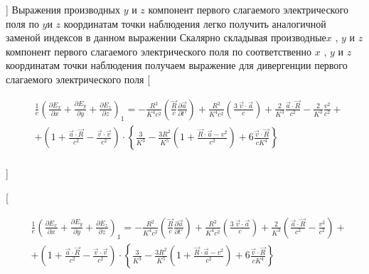 \documentclass[11pt]{article}
\begin{document}
{]} Выражения производных \(y\) и \(z\) компонент первого слагаемого
электрического поля по \(y\)и \(z\) координатам точки наблюдения легко
получить аналогичной заменой индексов в данном выражении Скалярно
складывая производные\(x\) , \(y\) и \(z\)компонент первого слагаемого
электрического поля по соответственно \(x\) , \(y\) и \(z\)координатам
точки наблюдения получаем выражение для дивергенции первого слагаемого
электрического поля {[}

\begin{align}
  & \frac{1}{e}{{\left( \frac{\partial {{E}_{x}}}{\partial x}+\frac{\partial {{E}_{y}}}{\partial y}+\frac{\partial {{E}_{z}}}{\partial z} \right)}_{1}}=-\frac{{{R}^{2}}}{{{K}^{4}}{{c}^{2}}}\left( \frac{\overrightarrow{R}}{c}\frac{\partial \overrightarrow{a}}{\partial t'} \right)+\frac{{{R}^{2}}}{{{K}^{4}}{{c}^{2}}}\left( \frac{3\ \overrightarrow{v}\cdot \overrightarrow{a}}{c} \right)+\frac{2}{{{K}^{3}}}\frac{\overrightarrow{a}\cdot \overrightarrow{R}}{{{c}^{2}}}-\frac{2}{{{K}^{3}}}\frac{{{v}^{2}}}{{{c}^{2}}}+ \\ 
 & +\left( 1+\frac{\overrightarrow{a}\cdot \overrightarrow{R}}{{{c}^{2}}}-\frac{\overrightarrow{v}\cdot \overrightarrow{v}}{{{c}^{2}}} \right)\cdot \left\{ \frac{3}{{{K}^{3}}}-\frac{3{{R}^{2}}}{{{K}^{5}}}\left( 1+\frac{\overrightarrow{R}\cdot \overrightarrow{a}-{{v}^{2}}}{{{c}^{2}}} \right)+6\frac{\overrightarrow{v}\cdot \overrightarrow{R}}{c{{K}^{4}}} \right\} \\ 
\end{align}

{]}

{[}

\begin{align}
  & \frac{1}{e}{{\left( \frac{\partial {{E}_{x}}}{\partial x}+\frac{\partial {{E}_{y}}}{\partial y}+\frac{\partial {{E}_{z}}}{\partial z} \right)}_{1}}=-\frac{{{R}^{2}}}{{{K}^{4}}{{c}^{2}}}\left( \frac{\overrightarrow{R}}{c}\frac{\partial \overrightarrow{a}}{\partial t'} \right)+\frac{{{R}^{2}}}{{{K}^{4}}{{c}^{2}}}\left( \frac{3\ \overrightarrow{v}\cdot \overrightarrow{a}}{c} \right)+\frac{2}{{{K}^{3}}}\left( \frac{\overrightarrow{a}\cdot \overrightarrow{R}}{{{c}^{2}}}-\frac{{{v}^{2}}}{{{c}^{2}}} \right)+ \\ 
 & +\left( 1+\frac{\overrightarrow{a}\cdot \overrightarrow{R}}{{{c}^{2}}}-\frac{\overrightarrow{v}\cdot \overrightarrow{v}}{{{c}^{2}}} \right)\cdot \left\{ \frac{3}{{{K}^{3}}}-\frac{3{{R}^{2}}}{{{K}^{5}}}\left( 1+\frac{\overrightarrow{R}\cdot \overrightarrow{a}-{{v}^{2}}}{{{c}^{2}}} \right)+6\frac{\overrightarrow{v}\cdot \overrightarrow{R}}{c{{K}^{4}}} \right\} \\ 
\end{align}
\end{document}
